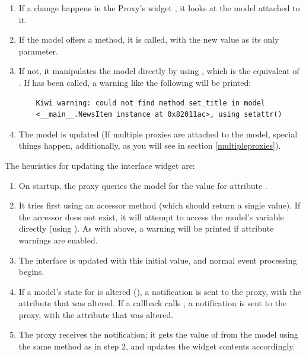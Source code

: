 \documentclass[a4paper]{howto}
\begin{document}
\begin{enumerate}
\item If a change happens in the Proxy's widget , it looks at
the model attached to it.
\item If the model offers a  method, it is called, with
the new value as its only parameter.
\item If not, it manipulates the model directly by using
, which is the equivalent of . If
 has been called, a warning like
the following will be printed:

    \begin{verbatim}
    Kiwi warning: could not find method set_title in model
    <__main__.NewsItem instance at 0x82011ac>, using setattr()
    \end{verbatim}

\item The model is updated (If multiple proxies are attached to the
model, special things happen, additionally, as you will see in section
\ref{multipleproxies}).
\end{enumerate}

The heuristics for updating the interface widget are:

\begin{enumerate}
\item On startup, the proxy queries the model for the value for
attribute .
\item It tries first using an accessor method 
(which should return a single value). If the accessor does not exist, it
will attempt to access the model's variable directly (using
). As with  above, a warning will be
printed if attribute warnings are enabled.
\item The interface is updated with this initial value, and normal
event processing begins.
\item If a model's state for  is altered (), a notification is sent to the proxy, with the attribute that
was altered. If a callback calls , a notification
is sent to the proxy, with the attribute that was altered.
\item The proxy receives the notification; it gets the value of 
from the model using the same method as in step 2, and updates the
widget contents accordingly.
\end{enumerate}
\end{document}
